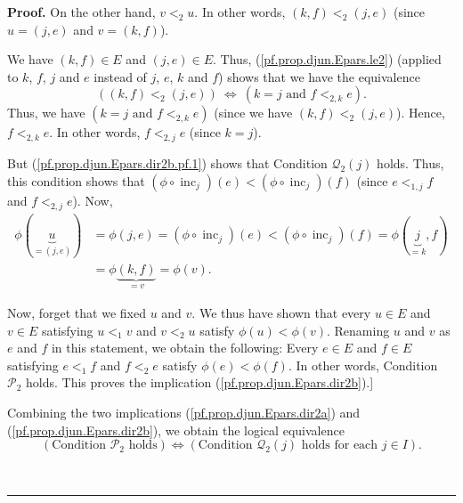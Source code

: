 \documentclass[numbers=enddot,12pt,final,onecolumn,notitlepage,abstracton]{scrartcl}
\theoremstyle{definition}
\newenvironment{proof}[1][Proof]{\noindent\textbf{#1.} }{\ \rule{0.5em}{0.5em}}
\newenvironment{verlong}{}{}
\begin{document}
\begin{verlong}
\begin{footnotesize}
\begin{proof}
On the other hand, $v<_{2}u$. In other words, $\left(  k,f\right)
<_{2}\left(  j,e\right)  $ (since $u=\left(  j,e\right)  $ and $v=\left(
k,f\right)  $).

We have $\left(  k,f\right)  \in E$ and $\left(  j,e\right)  \in E$. Thus,
(\ref{pf.prop.djun.Epars.le2}) (applied to $k$, $f$, $j$ and $e$ instead of
$j$, $e$, $k$ and $f$) shows that we have the equivalence%
\[
\left(  \left(  k,f\right)  <_{2}\left(  j,e\right)  \right)
\ \Longleftrightarrow\ \left(  k=j\text{ and }f<_{2,k}e\right)  .
\]
Thus, we have $\left(  k=j\text{ and }f<_{2,k}e\right)  $ (since we have
$\left(  k,f\right)  <_{2}\left(  j,e\right)  $). Hence, $f<_{2,k}e$. In other
words, $f<_{2,j}e$ (since $k=j$).

But (\ref{pf.prop.djun.Epars.dir2b.pf.1}) shows that Condition $\mathcal{Q}%
_{2}\left(  j\right)  $ holds. Thus, this condition shows that $\left(
\phi\circ\operatorname*{inc}\nolimits_{j}\right)  \left(  e\right)  <\left(
\phi\circ\operatorname*{inc}\nolimits_{j}\right)  \left(  f\right)  $ (since
$e<_{1,j}f$ and $f<_{2,j}e$). Now,%
\begin{align*}
\phi\left(  \underbrace{u}_{=\left(  j,e\right)  }\right)   &  =\phi\left(
j,e\right)  =\left(  \phi\circ\operatorname*{inc}\nolimits_{j}\right)  \left(
e\right)  <\left(  \phi\circ\operatorname*{inc}\nolimits_{j}\right)  \left(
f\right)  =\phi\left(  \underbrace{j}_{=k},f\right) \\
&  =\phi\underbrace{\left(  k,f\right)  }_{=v}=\phi\left(  v\right)  .
\end{align*}


Now, forget that we fixed $u$ and $v$. We thus have shown that every $u\in E$
and $v\in E$ satisfying $u<_{1}v$ and $v<_{2}u$ satisfy $\phi\left(  u\right)
<\phi\left(  v\right)  $. Renaming $u$ and $v$ as $e$ and $f$ in this
statement, we obtain the following: Every $e\in E$ and $f\in E$ satisfying
$e<_{1}f$ and $f<_{2}e$ satisfy $\phi\left(  e\right)  <\phi\left(  f\right)
$. In other words, Condition $\mathcal{P}_{2}$ holds. This proves the
implication (\ref{pf.prop.djun.Epars.dir2b}).]

Combining the two implications (\ref{pf.prop.djun.Epars.dir2a}) and
(\ref{pf.prop.djun.Epars.dir2b}), we obtain the logical equivalence%
\begin{equation}
\left(  \text{Condition }\mathcal{P}_{2}\text{ holds}\right)
\Longleftrightarrow\left(  \text{Condition }\mathcal{Q}_{2}\left(  j\right)
\text{ holds for each }j\in I\right)  . \label{pf.prop.djun.Epars.dir2}%
\end{equation}



\end{proof}
\end{footnotesize}
\end{verlong}
\end{document}

